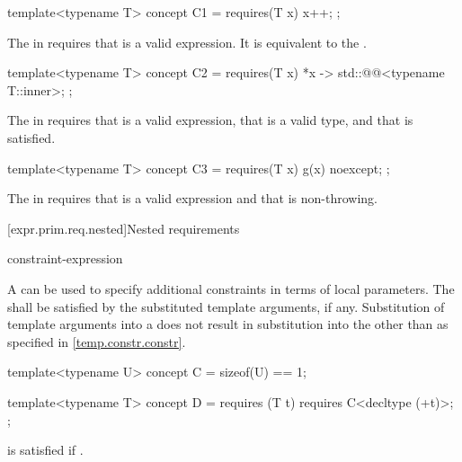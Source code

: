 \begin{example}
\begin{codeblock}
template<typename T> concept C1 = requires(T x) {
  {x++};
};
\end{codeblock}
The  in 
requires that  is a valid expression.
It is equivalent to the 
.

\begin{codeblock}
template<typename T> concept C2 = requires(T x) {
  {*x} -> std::@@<typename T::inner>;
};
\end{codeblock}

The  in 
requires that  is a valid expression,
that  is a valid type, and
that  is satisfied.

\begin{codeblock}
template<typename T> concept C3 =
  requires(T x) {
    {g(x)} noexcept;
  };
\end{codeblock}

The  in 
requires that  is a valid expression and
that  is non-throwing.
\end{example}

[expr.prim.req.nested]{Nested requirements}
%

\begin{bnf}
\br
     constraint-expression \terminal{;}
\end{bnf}

\pnum
A  can be used
to specify additional constraints in terms of local parameters.
The 
shall be satisfied
by the substituted template arguments, if any.
Substitution of template arguments into a 
does not result in substitution into the 
other than as specified in \ref{temp.constr.constr}.
\begin{example}
\begin{codeblock}
template<typename U> concept C = sizeof(U) == 1;

template<typename T> concept D = requires (T t) {
  requires C<decltype (+t)>;
};
\end{codeblock}
 is satisfied if .
\end{example}

